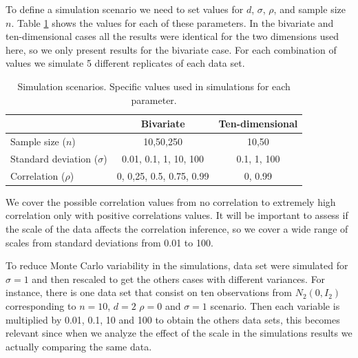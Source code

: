 \documentclass[a4paper]{article}
\newcommand{\matt}[1]{\textcolor{red}{(matt: #1)}}
\begin{document}
To define a simulation scenario we need to set values for $d$, $\sigma$, $\rho$, and sample size $n$. Table \ref{scen} shows the values for each of these parameters. In the bivariate and ten-dimensional cases all the results were identical for the two dimensions used here, so we only present results for the bivariate case. For each combination of values we simulate 5 different replicates of each data set.  

\begin{table}[htbp]
   \centering
   \caption{Simulation scenarios. Specific values used in simulations for each parameter. \label{scen}} 
     \begin{tabular}{lcc} \hline
          &  Bivariate    & Ten-dimensional  \\ \hline
      Sample size   ($n$)   & 10,50,250   &  10,50  \\
      Standard deviation ($\sigma$)  & 0.01, 0.1, 1, 10, 100 & 0.1, 1, 100 \\
      Correlation ($\rho$)   &  0, 0,25, 0.5, 0.75, 0.99  &  0, 0.99 \\ \hline
   \end{tabular}
\end{table}

We cover the possible correlation values from no correlation to extremely high correlation only with positive correlations values. It will be important to assess if the scale of the data affects the correlation inference, so we cover a wide range of scales from standard deviations from 0.01 to 100. 

To reduce Monte Carlo variability in the simulations, data set were simulated for $\sigma=1$ and then rescaled to get the others cases with different variances. For instance, there is one data set that consist on ten observations from $N_2(0, I_2 )$ corresponding to $n=10$, $d=2$ $\rho=0$ and $\sigma=1$ scenario. Then each variable is multiplied by 0.01, 0.1, 10  and 100 to obtain the others data sets, this becomes relevant since when we analyze the effect of the scale in the simulations results we actually comparing the same data. 
\end{document}

